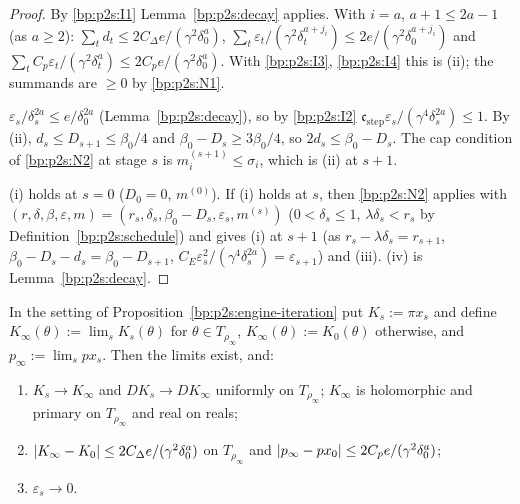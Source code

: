 \begin{proof}
\label{step:p2s:ei-sums}
By \ref{bp:p2s:I1} Lemma~\ref{bp:p2s:decay} applies. With $i=a$, $a+1\le2a-1$ (as $a\ge2$): $\sum_td_t\le2C_\Delta e/(\gamma^2\delta_0^a)$,
$\sum_t\varepsilon_t/(\gamma^2\delta_t^{a+j_i})\le2e/(\gamma^2\delta_0^{a+j_i})$ and $\sum_tC_p\varepsilon_t/(\gamma^2\delta_t^a)\le2C_pe/(\gamma^2\delta_0^a)$. With
\ref{bp:p2s:I3}, \ref{bp:p2s:I4} this is (ii); the summands are $\ge0$ by \ref{bp:p2s:N1}.

\label{step:p2s:ei-small}
$\varepsilon_s/\delta_s^{2a}\le e/\delta_0^{2a}$ (Lemma~\ref{bp:p2s:decay}), so by \ref{bp:p2s:I2}
$\mathfrak c_{\mathrm{step}}\varepsilon_s/(\gamma^4\delta_s^{2a})\le1$. By (ii), $d_s\le D_{s+1}\le\beta_0/4$ and $\beta_0-D_s\ge3\beta_0/4$, so
$2d_s\le\beta_0-D_s$. The cap condition of \ref{bp:p2s:N2} at stage $s$ is $m^{(s+1)}_i\le\sigma_i$, which is (ii) at $s+1$.

\label{step:p2s:ei-ind}
(i) holds at $s=0$ ($D_0=0$, $m^{(0)}$). If (i) holds at $s$, then \ref{bp:p2s:N2} applies with $(r,\delta,\beta,\varepsilon,m)=(r_s,\delta_s,\beta_0-D_s,
\varepsilon_s,m^{(s)})$ ($0<\delta_s\le1$, $\lambda\delta_s<r_s$ by Definition~\ref{bp:p2s:schedule}) and gives (i) at $s+1$ (as $r_s-\lambda\delta_s=r_{s+1}$,
$\beta_0-D_s-d_s=\beta_0-D_{s+1}$, $C_E\varepsilon_s^2/(\gamma^4\delta_s^{2a})=\varepsilon_{s+1}$) and (iii). (iv) is Lemma~\ref{bp:p2s:decay}.
\end{proof}

\begin{proposition}\label{bp:p2s:engine-limit}
In the setting of Proposition~\ref{bp:p2s:engine-iteration} put $K_s:=\pi x_s$ and define $K_\infty(\theta):=\lim_sK_s(\theta)$ for
$\theta\in T_{\rho_\infty}$, $K_\infty(\theta):=K_0(\theta)$ otherwise, and $p_\infty:=\lim_spx_s$. Then the limits exist, and:
\begin{enumerate}[label=(\alph*)]
\item $K_s\to K_\infty$ and $DK_s\to DK_\infty$ uniformly on $T_{\rho_\infty}$; $K_\infty$ is holomorphic and primary on $T_{\rho_\infty}$ and real on
  reals;
\item $\lvert K_\infty-K_0\rvert\le2C_\Delta e/(\gamma^2\delta_0^a)$ on $T_{\rho_\infty}$ and $\lvert p_\infty-px_0\rvert\le2C_pe/(\gamma^2\delta_0^a)$;
\item $\varepsilon_s\to0$.
\end{enumerate}
\end{proposition}

